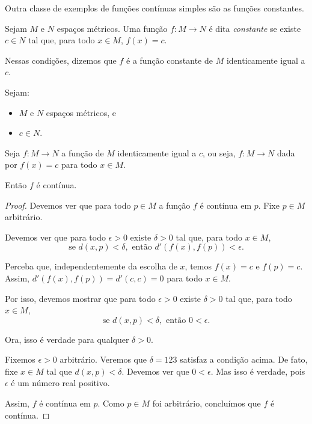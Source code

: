 Outra classe de exemplos de funções contínuas simples são as funções constantes.

\begin{definition}
    Sejam $M$ e $N$ espaços métricos.
    Uma função $f: M\rightarrow N$ é dita \emph{constante} se existe $c\in N$ tal que, para todo $x\in M$, $f(x) = c$.

    Nessas condições, dizemos que $f$ é a função constante de $M$ identicamente igual a $c$.
\end{definition}
\begin{proposition}
    Sejam:
    \begin{itemize}
        \item $M$ e $N$ espaços métricos, e
        \item $c \in N$.
    \end{itemize}

    Seja $f: M\rightarrow N$ a função de $M$ identicamente igual a $c$, ou seja, $f: M\rightarrow N$ dada por $f(x) = c$ para todo $x\in M$.

    Então $f$ é contínua.
\end{proposition}


\begin{proof}
    Devemos ver que para todo $p\in M$ a função $f$ é contínua em $p$.
    Fixe $p\in M$ arbitrário.

    Devemos ver que para todo $\epsilon>0$ existe $\delta>0$ tal que, para todo $x\in M$,
    \[
        \text{se } d(x, p) < \delta, \text{ então } d'(f(x), f(p)) < \epsilon.
    \]

    Perceba que, independentemente da escolha de $x$, temos $f(x) = c$ e $f(p) = c$.
    Assim, $d'(f(x), f(p)) = d'(c, c) = 0$ para todo $x\in M$.

    Por isso, devemos mostrar que para todo $\epsilon>0$ existe $\delta>0$ tal que, para todo $x\in M$,
    \[
        \text{se } d(x, p) < \delta, \text{ então } 0 < \epsilon.
    \]

    Ora, isso é verdade para qualquer $\delta>0$.

    Fixemos $\epsilon>0$ arbitrário.
    Veremos que $\delta = 123$ satisfaz a condição acima.
    De fato, fixe $x \in M$ tal que $d(x, p) < \delta$.
    Devemos ver que $0 < \epsilon$.
    Mas isso é verdade, pois $\epsilon$ é um número real positivo.

    Assim, $f$ é contínua em $p$.
    Como $p\in M$ foi arbitrário, concluímos que $f$ é contínua.
\end{proof}

